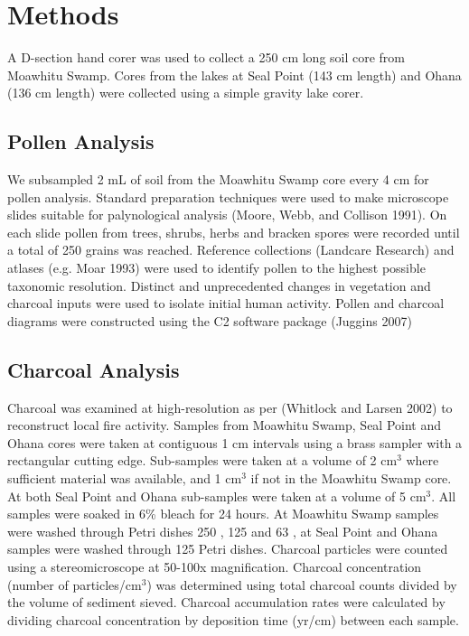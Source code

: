 \documentclass[]{article}
\begin{document}
\section{Methods}\label{methods}

A D-section hand corer was used to collect a 250 cm long soil core from Moawhitu Swamp. Cores from the lakes at Seal Point (143 cm length) and Ohana (136 cm length) were collected using a simple gravity lake corer.

\subsection{Pollen Analysis}\label{pollen-analysis}

We subsampled 2 mL of soil from the Moawhitu Swamp core every 4 cm for pollen analysis. Standard preparation techniques were used to make microscope slides suitable for palynological analysis (Moore, Webb, and Collison 1991). On each slide pollen from trees, shrubs, herbs and bracken spores were recorded until a total of 250 grains was reached. Reference collections (Landcare Research) and atlases (e.g. Moar 1993) were used to identify pollen to the highest possible taxonomic resolution. Distinct and unprecedented changes in vegetation and charcoal inputs were used to isolate initial human activity. Pollen and charcoal diagrams were constructed using the C2 software package (Juggins 2007)

\subsection{Charcoal Analysis}\label{charcoal-analysis}

Charcoal was examined at high-resolution as per (Whitlock and Larsen 2002) to reconstruct local fire activity. Samples from Moawhitu Swamp, Seal Point and Ohana cores were taken at contiguous 1 cm intervals using a brass sampler with a rectangular cutting edge. Sub-samples were taken at a volume of 2 cm\({}^{3}\) where sufficient material was available, and 1 cm\({}^{3}\) if not in the Moawhitu Swamp core. At both Seal Point and Ohana sub-samples were taken at a volume of 5 cm\({}^{3}\). All samples were soaked in 6\% bleach for 24 hours. At Moawhitu Swamp samples were washed through Petri dishes 250 , 125 and 63 , at Seal Point and Ohana samples were washed through 125 Petri dishes. Charcoal particles were counted using a stereomicroscope at 50-100x magnification. Charcoal concentration (number of particles/cm\({}^{3}\)) was determined using total charcoal counts divided by the volume of sediment sieved. Charcoal accumulation rates were calculated by dividing charcoal concentration by deposition time (yr/cm) between each sample.
\end{document}
